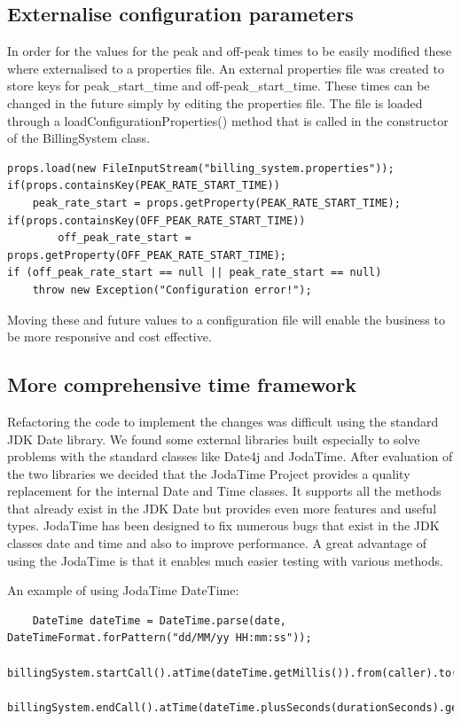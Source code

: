\documentclass[pdftex,11pt,a4paper]{article}
\begin{document}
\subsection{Externalise configuration parameters}
In order for the values for the peak and off-peak times to be easily modified these where externalised to a properties file. An external properties file was created to store keys for peak\_start\_time and off-peak\_start\_time. These times can be changed in the future simply by editing the properties file. The file is loaded through a loadConfigurationProperties() method that is called in the constructor of the BillingSystem class. 

\begin{lstlisting}
props.load(new FileInputStream("billing_system.properties"));
if(props.containsKey(PEAK_RATE_START_TIME))
	peak_rate_start = props.getProperty(PEAK_RATE_START_TIME);
if(props.containsKey(OFF_PEAK_RATE_START_TIME))
     	off_peak_rate_start = props.getProperty(OFF_PEAK_RATE_START_TIME);
if (off_peak_rate_start == null || peak_rate_start == null)
	throw new Exception("Configuration error!");	
\end{lstlisting}

Moving these and future values to a configuration file will enable the business to be more responsive and cost effective.

\subsection{More comprehensive time framework}
Refactoring the code to implement the changes was difficult using the standard JDK Date library. We found some external libraries built especially to solve problems with the standard classes like Date4j and JodaTime. After evaluation of the two libraries we decided that the JodaTime Project provides a quality replacement for the internal Date and Time classes. It supports all the methods that already exist in the JDK Date but provides even more features and useful types. JodaTime has been designed to fix numerous bugs that exist in the JDK classes date and time and also to improve performance. A great advantage of using the JodaTime is that it enables much easier testing with various methods. 

An example of using JodaTime DateTime:
\begin{lstlisting}
	DateTime dateTime = DateTime.parse(date, DateTimeFormat.forPattern("dd/MM/yy HH:mm:ss"));
	billingSystem.startCall().atTime(dateTime.getMillis()).from(caller).to(callee);
	billingSystem.endCall().atTime(dateTime.plusSeconds(durationSeconds).getMillis()).from(caller).to(callee);
\end{lstlisting}
\end{document}
